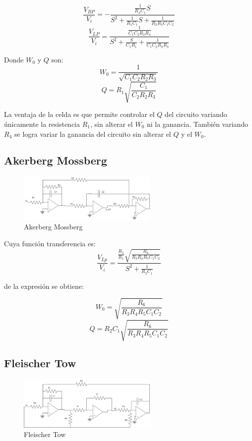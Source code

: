 \documentclass[../../tc_tp5_main.tex]{subfiles}
\begin{document}
$$\frac{V_{BP}}{V_i}=-\frac{\frac{1}{R_4 C_1}S}{S^2 +\frac{1}{R_1 C_1}S+\frac{1}{R_2 R_3 C_1 C_2}}$$
$$\frac{V_{LP}}{V_i}=\frac{\frac{1}{C_1 C_2 R_2 R_4}}{S^2 + \frac{S}{C_1 R_1}+ \frac{1}{C_1 C_2 R_2 R_3}} $$

Donde $W_0$ y $Q$ son:
$$ W_0=\frac{1}{\sqrt{C_1 C_2 R_2 R_3}} $$
$$ Q= R_1 \sqrt{\frac{C_1}{C_2 R_2 R_3}}$$
 
La ventaja de la celda es que permite controlar el $Q$ del circuito variando únicamente la resistencia $R_1$, sin alterar el $W_0$ ni la ganancia. También variando $R_4$ se logra variar la ganancia del circuito sin alterar el $Q$ y el $W_0$.

\subsection{Akerberg Mossberg}

\begin{figure}[H]	
	\centering
	\includegraphics[width=0.6\textwidth]{imagenes/am.png}
	\caption{Akerberg Mossberg}
\end{figure}

Cuya función transferencia es:
$$\frac{V_{Lp}}{V_i}=\frac{\frac{R_5}{R_1}\sqrt{\frac{R_6}{R_3 R_4 R_5 C_1 C_2}}}{S^2 + \frac{1}{R_2 C_1}} $$

de la expresión se obtiene:

$$W_0=\sqrt{\frac{R_6}{R_3 R_4 R_5 C_1 C_2}} $$
$$Q=R_2 C_1 \sqrt{\frac{R_6}{R_3 R_4 R_5 C_1 C_2}}  $$


\subsection{Fleischer Tow}

\begin{figure}[H]	
	\centering
	\includegraphics[width=0.6\textwidth]{imagenes/ft.png}
	\caption{Fleischer Tow}
\end{figure}
 
\end{document}
